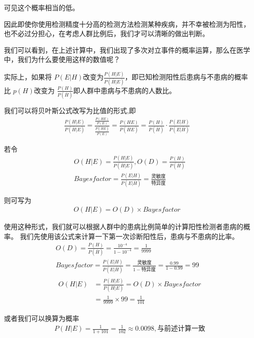 \documentclass[a4paper,AutoFakeBold,oneside,12pt,fontset=windows]{book}
\begin{document}
可见这个概率相当的低。

因此即使你使用检测精度十分高的检测方法检测某种疾病，并不幸被检测为阳性，
也不必过分担心，在考虑人群比例后，我们才可以清晰的做出判断。

我们可以看到，在上述计算中，我们出现了多次对立事件的概率运算，那么在医学中，我们为什么要使用这样的数值呢？

实际上，如果将 $P(E|H)$改变为$\frac{P(H|E)}{P(\overline H|E)}$，即已知检测阳性后患病与不患病的概率比
$p(H)$改变为 $\frac{P(H)}{P(\overline{H})}$即人群中患病与不患病的人数比。

我们可以将贝叶斯公式改写为比值的形式,即
\begin{align*}
	\frac{P(H|E)}{P(\overline H|E)}
	=\frac{\frac{P(HE)}{P(E)}}{\frac{P(\overline HE)}{P(E)}}
	=\frac{P(HE)}{P(\overline HE)}
	=\frac{P(H)}{P(\overline{H})}\cdot \frac{ P(E|H)}{ P(E|\overline{H})}
\end{align*}

若令
\begin{align*}	
	&O(H|E)=\frac{P(H|E)}{P(\overline H|E)},O(D)=\frac{P(H)}{P(\overline{H})}\\
	&Bayesfactor=\frac{ P(E|H)}{ P(E|\overline{H})}=\frac{\mbox{灵敏度}}{\mbox{特异度}}
\end{align*}

则可写为
\begin{gather*}
	O(H|E)=O(D)\times{Bayesfactor}
\end{gather*}

使用这种形式，我们就可以根据人群中的患病比例简单的计算阳性检测者患病的概率。
我们先使用该公式来计算一下第一次诊断阳性后，患病与不患病的比率。
\begin{align*}
	&O(D)=\frac{P(H)}{P(\overline{H})}=\frac{10^{-4}}{1-10^{-4}}=\frac{1}{9999}\\
	&Bayesfactor=\frac{ P(E|H)}{ P(E|\overline{H})}=\frac{\mbox{灵敏度}}{1-\mbox{特异度}}=\frac{0.99}{1-0.99}=99\\
	&{
		\begin{aligned}
			O(H|E)&=\frac{P(H|E)}{P(\overline H|E)}=O(D)\times{Bayesfactor}\\
			&=\frac{1}{9999}\times99=\frac{1}{101}
		\end{aligned}
	}
\end{align*}

或者我们可以换算为概率
\begin{align*}
	&P(H|E)=\frac{1}{1+101}=\frac{1}{102}\approx{0.0098},{\mbox{与前述计算一致}}
\end{align*}
\end{document}
